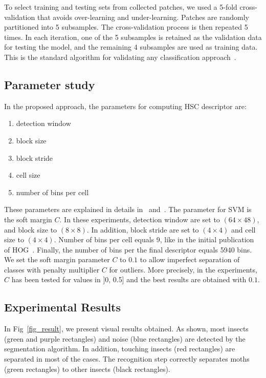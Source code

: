 \documentclass[a4paper,conference]{IEEEtran}
\begin{document}
To select training and testing sets from collected patches, we used a 5-fold cross-validation that avoids over-learning and under-learning. Patches are randomly partitioned into 5 subsamples. The cross-validation process is then repeated 5 times. In each iteration, one of the 5 subsamples is retained as the validation data for testing the model, and the remaining 4 subsamples are used as training data. This is the standard algorithm for validating any classification approach~\cite{kohavi1995study}. 


\subsection{Parameter study}\label{sec:parameter}
In the proposed approach, the parameters for computing HSC descriptor are: 
\begin{enumerate}
\item detection window
\item block size
\item block stride
\item cell size
\item number of bins per cell
\end{enumerate}
These parameters are explained in details in~\cite{7532314} and~\cite{rashwan2018using}. The parameter for SVM is the soft margin $C$. 
In these experiments, detection window are set to $(64 \times 48)$, and block size to $(8 \times 8)$. In addition, block stride are set to $(4 \times 4)$ and cell size to $(4 \times 4)$. Number of bins per cell equals 9, like in the initial publication of HOG~\cite{dalal2005histograms}. Finally, the number of bins per the final descriptor equals 5940 bins. We set the soft margin parameter $C$ to $0.1$ to allow imperfect separation of classes with penalty multiplier $C$ for outliers. More precisely, in the experiments, $C$ has been tested for values in ]0, 0.5] 
and the best results are obtained with $0.1$. 

\subsection{Experimental Results}

In Fig~\ref{fig_result}, we present visual results obtained. As shown, most insects (green and purple rectangles) and noise (blue rectangles) are detected by the segmentation algorithm. In addition, touching insects (red rectangles) are separated in most of the cases. The recognition step correctly separates moths (green rectangles) to other insects (black rectangles). 
\end{document}
